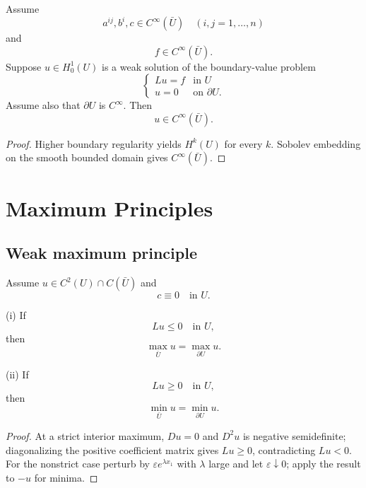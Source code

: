\begin{theorem}
\label{thm:boundary-infinite-differentiability}

Assume
$$a^{ij}, b^i, c \in C^\infty(\bar U) \quad (i,j=1,\ldots,n)$$
and
$$f \in C^\infty(\bar U).$$
Suppose $u \in H_0^1(U)$ is a weak solution of the boundary-value problem
$$\begin{cases} Lu = f & \text{in } U \\ u = 0 & \text{on } \partial U. \end{cases}$$
Assume also that $\partial U$ is $C^\infty$. Then
$$u \in C^\infty(\bar U).$$
\end{theorem}

\begin{proof}
\sketch Higher boundary regularity yields $H^k(U)$ for every $k$. Sobolev embedding on the smooth bounded domain gives $C^\infty(\bar U)$.
\end{proof}

\section{Maximum Principles}
\label{sec:elliptic-maximum-principles}

\subsection{Weak maximum principle}

\begin{theorem}
\label{thm:weak-maximum-principle-c-zero}

Assume $u \in C^2(U) \cap C(\bar U)$ and
$$c \equiv 0 \quad \text{in } U.$$

(i) If
$$Lu \leq 0 \quad \text{in } U,$$
then
$$\max_{\bar U} u = \max_{\partial U} u.$$

(ii) If
$$Lu \geq 0 \quad \text{in } U,$$
then
$$\min_{\bar U} u = \min_{\partial U} u.$$
\end{theorem}

\begin{proof}
\sketch At a strict interior maximum, $Du=0$ and $D^2u$ is negative semidefinite; diagonalizing the positive coefficient matrix gives $Lu\ge0$, contradicting $Lu<0$. For the nonstrict case perturb by $\varepsilon e^{\lambda x_1}$ with $\lambda$ large and let $\varepsilon\downarrow0$; apply the result to $-u$ for minima.
\end{proof}


